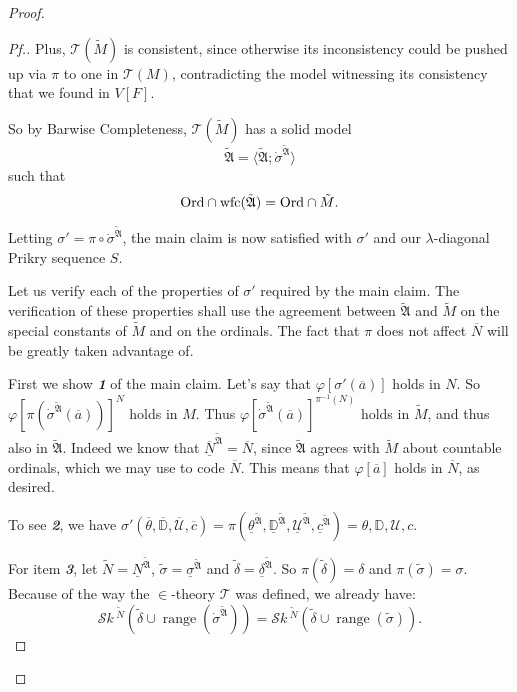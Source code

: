 \documentclass{amsart}
\theoremstyle{definition}
\theoremstyle{remark}
\newcommand{\D}{\mathbb{D}}
\newcommand{\N}{{\overline{N}}}
\newcommand{\U}{\mathcal{U}}
\newcommand{\Ord}{\textup{\ensuremath{\text{Ord}}}}
\DeclareMathOperator{\ran}{range}
\newcommand{\SH}{\mathcal{S}\textit{k} \,}
\newcommand{\sk}[3]{\SH^{#1}( {#2} \cup {\ran(#3)} ) }
\begin{document}
\begin{proof}
\begin{proof}[Pf.]
Plus, $\mathcal T(\tilde M)$ is consistent, since otherwise its inconsistency could be pushed up via $\pi$ to one in $\mathcal T(M)$, contradicting the model witnessing its consistency that we found in $V[F]$. 

So by Barwise Completeness, $\mathcal T(\tilde M)$ has a solid model $$\tilde{\mathfrak A} = \langle \tilde{\mathfrak A}; \dot{\sigma}^{\tilde{\mathfrak A}} \rangle$$ such that $$\text{Ord} \cap \text{wfc}(\tilde{\mathfrak A}) = \Ord \cap \tilde M.$$ 

Letting $\sigma'=\pi \circ \dot{\sigma}^{\tilde{\mathfrak A}}$, the main claim is now satisfied with $\sigma'$ and our $\lambda$-diagonal Prikry sequence $S$. 

Let us verify each of the properties of $\sigma'$ required by the main claim. The verification of these properties shall use the agreement between $\tilde{\mathfrak A}$ and $\tilde M$ on the special constants of $\tilde M$ and on the ordinals. The fact that $\pi$ does not affect $\N$ will be greatly taken advantage of.

First we show \textsl{\textbf{1}} of the main claim. Let's say that $\varphi[\sigma'(\overline a)]$ holds in $N$. So $\varphi[\pi(\dot \sigma^{\tilde{\mathfrak A}}(\overline a))]^N$ holds in $M$. Thus $\varphi[\dot \sigma^{\tilde{\mathfrak A}}(\overline a)]^{\pi^{-1}(N)}$ holds in $\tilde M$, and thus also in $\tilde{\mathfrak A}$. Indeed we know that $\underline{\N}^{\tilde{\mathfrak A}} = \N$, since $\tilde{\mathfrak A}$ agrees with $\tilde M$ about countable ordinals, which we may use to code $\N$. This means that $\varphi[\overline a]$ holds in $\N$, as desired.

To see \textsl{\textbf{2}}, we have $\sigma'(\overline \theta, \overline{\D}, \overline{\U}, \overline c)= \pi(\underline{\theta}^{\tilde{\mathfrak A}}, \underline{\D}^{\tilde{\mathfrak A}}, \underline{\U}^{\tilde{\mathfrak A}}, \underline{c}^{\tilde{\mathfrak A}})=\theta, \D, \U, c$.

For item \textsl{\textbf{3}}, let $\tilde N = \underline N^{\tilde{\mathfrak A}}$, $\tilde \sigma = \underline \sigma^{\tilde{\mathfrak A}}$ and $\tilde \delta = \underline{\delta}^{\tilde{\mathfrak A}}$. So $\pi(\tilde \delta)= \delta$ and $\pi(\tilde \sigma)=\sigma$. Because of the way the $\in$-theory $\mathcal T$ was defined, we already have: 
\begin{equation}\label{eqn:SkDotSigma=SkTildeSigma} \sk{\tilde N}{\tilde \delta}{\dot \sigma^{\tilde{\mathfrak A}}} = \sk{\tilde N}{\tilde \delta}{\tilde \sigma}. \end{equation}


\end{proof}
\end{proof}
\end{document}
